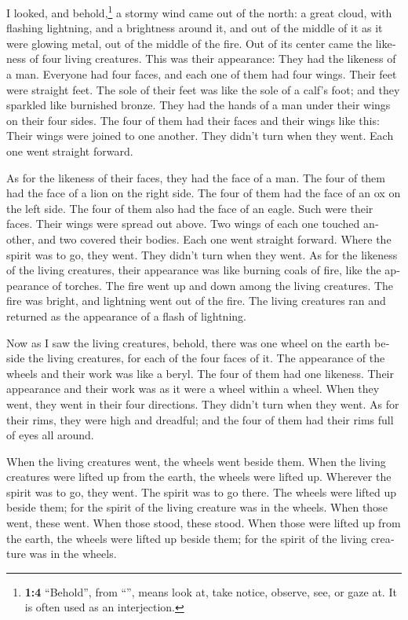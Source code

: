 \begin{paracol}{2}
\begin{otherlanguage}{english}
 I looked, and behold,\footnote{\textbf{1:4} ``Behold'',
  from ``'', means look at, take notice, observe, see, or
  gaze at. It is often used as an interjection.} a stormy wind came out
of the north: a great cloud, with flashing lightning, and a brightness
around it, and out of the middle of it as it were glowing metal, out of
the middle of the fire.  Out of its center came the
likeness of four living creatures. This was their appearance: They had
the likeness of a man.  Everyone had four faces, and each
one of them had four wings.  Their feet were straight
feet. The sole of their feet was like the sole of a calf's foot; and
they sparkled like burnished bronze.  They had the hands
of a man under their wings on their four sides. The four of them had
their faces and their wings like this:  Their wings were
joined to one another. They didn't turn when they went. Each one went
straight forward.

 As for the likeness of their faces, they had the face of
a man. The four of them had the face of a lion on the right side. The
four of them had the face of an ox on the left side. The four of them
also had the face of an eagle.  Such were their faces.
Their wings were spread out above. Two wings of each one touched
another, and two covered their bodies.  Each one went
straight forward. Where the spirit was to go, they went. They didn't
turn when they went.  As for the likeness of the living
creatures, their appearance was like burning coals of fire, like the
appearance of torches. The fire went up and down among the living
creatures. The fire was bright, and lightning went out of the fire.
 The living creatures ran and returned as the appearance
of a flash of lightning.

 Now as I saw the living creatures, behold, there was one
wheel on the earth beside the living creatures, for each of the four
faces of it.  The appearance of the wheels and their work
was like a beryl. The four of them had one likeness. Their appearance
and their work was as it were a wheel within a wheel. 
When they went, they went in their four directions. They didn't turn
when they went.  As for their rims, they were high and
dreadful; and the four of them had their rims full of eyes all around.

 When the living creatures went, the wheels went beside
them. When the living creatures were lifted up from the earth, the
wheels were lifted up.  Wherever the spirit was to go,
they went. The spirit was to go there. The wheels were lifted up beside
them; for the spirit of the living creature was in the wheels.
 When those went, these went. When those stood, these
stood. When those were lifted up from the earth, the wheels were lifted
up beside them; for the spirit of the living creature was in the wheels.


\end{otherlanguage}
\end{paracol}
